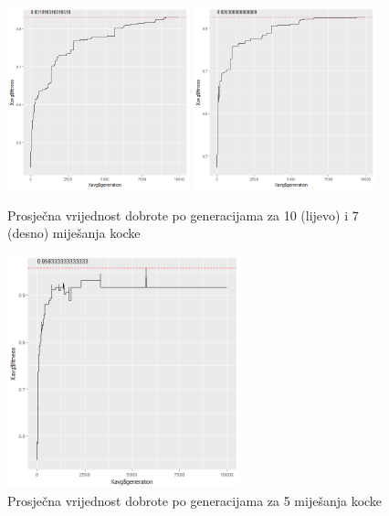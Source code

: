 \documentclass[times, utf8, seminar, numeric]{fer}
\begin{document}
		  		\begin{figure}[h]
			\centering
			\includegraphics[width=0.47\textwidth]{../results/sumsides_fitness/10_scrambles/cross0,5greedy10mut20.png}
			\includegraphics[width=0.47\textwidth]{../results/sumsides_fitness/7_scrambles/cross0,5greedy10mut20.png}
			\caption{Prosječna vrijednost dobrote po generacijama za 10 (lijevo) i 7 (desno) miješanja kocke }
		\end{figure}
		
		  		\begin{figure}[h]
			\centering
			\includegraphics[width=0.6\textwidth]{../results/sumsides_fitness/5_scrambles/cross0,5greedy10mut20.png}
			\caption{Prosječna vrijednost dobrote po generacijama za 5 miješanja kocke }
		\end{figure}
\end{document}
